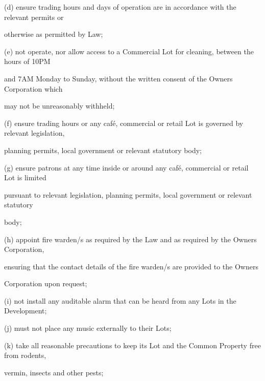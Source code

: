 \documentclass{article}
\begin{document}
{\fontsize{9.962}{1}(d) ensure trading hours and days of operation are in accordance with the relevant permits or }

{\fontsize{10.02}{1}otherwise as permitted by Law; }

{\fontsize{9.962}{1}(e) not operate, nor allow access to a Commercial Lot for cleaning, between the hours of 10PM }

{\fontsize{10.02}{1}and 7AM Monday to Sunday, without the written consent of the Owners Corporation which }

\newpage


















{\fontsize{10.02}{1}may not be unreasonably withheld; }

{\fontsize{9.962}{1}(f) ensure trading hours or any café, commercial or retail Lot is governed by relevant legislation, }

{\fontsize{10.02}{1}planning permits, local government or relevant statutory body; }

{\fontsize{9.962}{1}(g) ensure patrons at any time inside or around any café, commercial or retail Lot is limited }

{\fontsize{10.02}{1}pursuant to relevant legislation, planning permits, local government or relevant statutory }

{\fontsize{10.02}{1}body; }

{\fontsize{9.962}{1}(h) appoint fire warden/s as required by the Law and as required by the Owners Corporation, }

{\fontsize{10.02}{1}ensuring that the contact details of the fire warden/s are provided to the Owners }

{\fontsize{10.02}{1}Corporation upon request; }

{\fontsize{9.962}{1}(i) not install any auditable alarm that can be heard from any Lots in the Development; }

{\fontsize{9.962}{1}(j) must not place any music externally to their Lots; }

{\fontsize{9.962}{1}(k) take all reasonable precautions to keep its Lot and the Common Property free from rodents, }

{\fontsize{10.02}{1}vermin, insects and other pests; }
\end{document}
